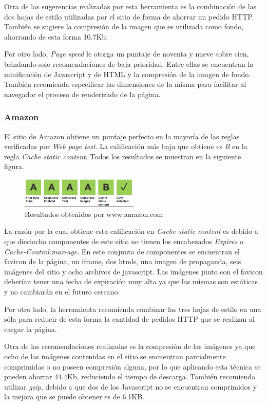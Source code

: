 Otra de las sugerencias realizadas por esta herramienta es la combinación de las dos hojas de estilo utilizadas por el sitio de forma de ahorrar un pedido HTTP. También se sugiere la
compresión de la imagen que es utilizada como fondo, ahorrando de esta forma 10.7Kb.

Por otro lado, \emph{Page speed} le otorga un puntaje de noventa y nueve sobre cien, brindando solo recomendaciones de baja prioridad. Entre ellas se encuentran la minificación
de Javascript y de HTML y la compresión de la imagen de fondo. También recomienda especificar las dimensiones de la misma para facilitar al navegador el proceso de renderizado
de la página.

\subsubsection{Amazon}
El sitio de Amazon obtiene un puntaje perfecto en la mayoría de las reglas verificadas por \emph{Web page test}. La calificación más baja que obtiene es \emph{B} en la regla
\emph{Cache static content}. Todos los resultados se muestran en la siguiente figura.

\begin{figure}[h]
\centering
\includegraphics[width=0.5\textwidth]{figuras/lado_cliente/amazon/page_results.png}
  \caption{Resultados obtenidos por www.amazon.com}
    \label{fig.amazon_page_results}
\end{figure}

La razón por la cual obtiene esta calificación en \emph{Cache static content} es debido a que dieciocho componentes de este sitio no tienen los encabezados \emph{Expires}
o \emph{Cache-Control:max-age}. En este conjunto de componentes se encuentran el favicon de la página, un iframe, dos htmls, una imagen de propaganda, seis imágenes del sitio y ocho archivos de javascript. Las imágenes junto con el favicon deberían tener una fecha de expiración muy alta ya que las mismas son estáticas y no cambiarán en el futuro cercano.

Por otro lado, la herramienta recomienda combinar las tres hojas de estilo en una sóla para reducir de esta forma la cantidad de pedidos HTTP que se realizan al cargar la página.

Otra de las recomendaciones realizadas es la compresión de las imágenes ya que ocho de las imágenes contenidas en el sitio se encuentran parcialmente comprimidas o no poseen
compresión alguna, por lo que aplicando esta técnica se pueden ahorrar 44.4Kb, reduciendo el tiempo de descarga. También recomienda utilizar \emph{gzip}, debido a que dos
de los Javascript no se encuentran comprimidos y la mejora que se puede obtener es de 6.1KB.

